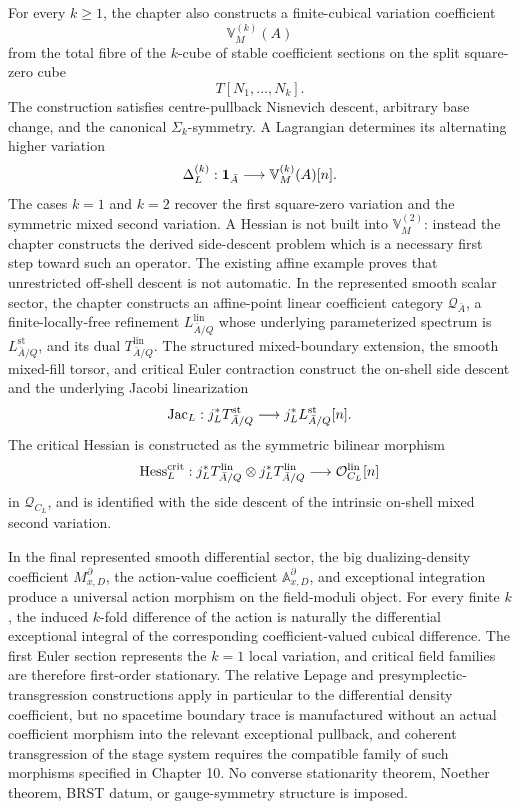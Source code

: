 For every \(k\ge1\), the chapter also constructs a finite-cubical variation coefficient
\[
    \boxed{
    \mathbb V_M^{(k)}(A)
    }
\]
from the total fibre of the \(k\)-cube of stable coefficient sections on the split square-zero cube
\[
    T[N_1,\ldots,N_k].
\]
The construction satisfies centre-pullback Nisnevich descent, arbitrary base change, and the canonical \(\Sigma_k\)-symmetry. A Lagrangian determines its alternating higher variation
\[
    \Delta_L^{(k)}:
    \mathbf 1_{\bar A}\longrightarrow\mathbb V_M^{(k)}(A)[n].
\]
The cases \(k=1\) and \(k=2\) recover the first square-zero variation and the symmetric mixed second variation. A Hessian is not built into \(\mathbb V_M^{(2)}\): instead the chapter constructs the derived side-descent problem which is a necessary first step toward such an operator. The existing affine example proves that unrestricted off-shell descent is not automatic.  In the represented smooth scalar sector, the chapter constructs an affine-point linear coefficient category \(\mathcal Q_{\bar A}\), a finite-locally-free refinement \(L^{\mathrm{lin}}_{\bar A/Q}\) whose underlying parameterized spectrum is \(L^{\mathrm{st}}_{\bar A/Q}\), and its dual \(T^{\mathrm{lin}}_{\bar A/Q}\). The structured mixed-boundary extension, the smooth mixed-fill torsor, and critical Euler contraction construct the on-shell side descent and the underlying Jacobi linearization
\[
    \operatorname{Jac}_L:
    j_L^*T^{\mathrm{st}}_{\bar A/Q}
    \longrightarrow
    j_L^*L^{\mathrm{st}}_{\bar A/Q}[n].
\]
The critical Hessian is constructed as the symmetric bilinear morphism
\[
    \operatorname{Hess}_L^{\mathrm{crit}}:
    j_L^*T^{\mathrm{lin}}_{\bar A/Q}
    \otimes
    j_L^*T^{\mathrm{lin}}_{\bar A/Q}
    \longrightarrow
    \mathcal O^{\mathrm{lin}}_{C_L}[n]
\]
in \(\mathcal Q_{C_L}\), and is identified with the side descent of the intrinsic on-shell mixed second variation.

In the final represented smooth differential sector, the big dualizing-density coefficient \(M^\partial_{x,D}\), the action-value coefficient \(\mathbb A^\partial_{x,D}\), and exceptional integration produce a universal action morphism on the field-moduli object. For every finite \(k\), the induced \(k\)-fold difference of the action is naturally the differential exceptional integral of the corresponding coefficient-valued cubical difference. The first Euler section represents the \(k=1\) local variation, and critical field families are therefore first-order stationary. The relative Lepage and presymplectic-transgression constructions apply in particular to the differential density coefficient, but no spacetime boundary trace is manufactured without an actual coefficient morphism into the relevant exceptional pullback, and coherent transgression of the stage system requires the compatible family of such morphisms specified in Chapter 10. No converse stationarity theorem, Noether theorem, BRST datum, or gauge-symmetry structure is imposed.

